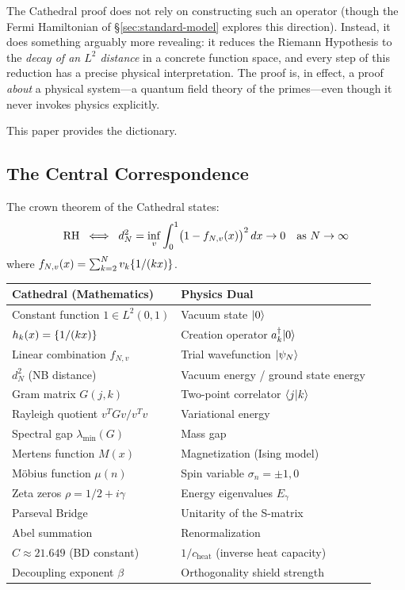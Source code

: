 \documentclass[11pt,a4paper]{article}
\begin{document}
The Cathedral proof does not rely on constructing such an operator
(though the Fermi Hamiltonian of \S\ref{sec:standard-model}
explores this direction). Instead, it does
something arguably more revealing: it reduces the Riemann Hypothesis to
the \emph{decay of an $L^2$ distance} in a concrete function space, and
every step of this reduction has a precise physical interpretation. The proof
is, in effect, a proof \emph{about} a physical system---a quantum field
theory of the primes---even though it never invokes physics explicitly.

This paper provides the dictionary.

\subsection{The Central Correspondence}

The crown theorem of the Cathedral states:
\[
  \mathrm{RH} \;\iff\;
  d_N^2 = \inf_v \int_0^1 \bigl(1 - f_{N,v}(x)\bigr)^2\,dx \to 0
  \quad\text{as } N \to \infty
\]
where $f_{N,v}(x) = \sum_{k=2}^N v_k \{1/(kx)\}$.

\begin{correspondence}
\label{corr:master}
\begin{center}
\begin{tabular}{@{}ll@{}}
\toprule
\textbf{Cathedral (Mathematics)} & \textbf{Physics Dual} \\
\midrule
Constant function $1 \in L^2(0,1)$ & Vacuum state $| 0 \rangle$ \\
$h_k(x) = \{1/(kx)\}$ & Creation operator $a_k^\dagger | 0 \rangle$ \\
Linear combination $f_{N,v}$ & Trial wavefunction $| \psi_N \rangle$ \\
$d_N^2$ (NB distance) & Vacuum energy / ground state energy \\
Gram matrix $G(j,k)$ & Two-point correlator $\langle j | k \rangle$ \\
Rayleigh quotient $v^T G v / v^T v$ & Variational energy \\
Spectral gap $\lambda_{\min}(G)$ & Mass gap \\
Mertens function $M(x)$ & Magnetization (Ising model) \\
M\"obius function $\mu(n)$ & Spin variable $\sigma_n = \pm 1, 0$ \\
Zeta zeros $\rho = 1/2 + i\gamma$ & Energy eigenvalues $E_\gamma$ \\
Parseval Bridge & Unitarity of the S-matrix \\
Abel summation & Renormalization \\
$C \approx 21.649$ (BD constant) & $1/c_{\text{heat}}$ (inverse heat capacity) \\
Decoupling exponent $\beta$ & Orthogonality shield strength \\
\bottomrule
\end{tabular}
\end{center}
\end{correspondence}
\end{document}
